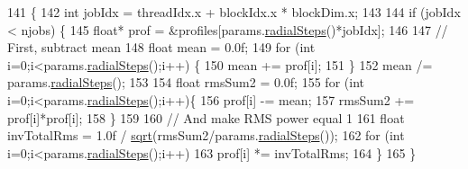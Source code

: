 \begin{DoxyCode}
141 \{
142     \textcolor{keywordtype}{int} jobIdx = threadIdx.x + blockIdx.x * blockDim.x;
143 
144     \textcolor{keywordflow}{if} (jobIdx < njobs) \{
145         \textcolor{keywordtype}{float}* prof = &profiles[params.\hyperlink{struct_z_l_u_t_params_a9579a1f453fa4966bbd7ca5c04a389d9}{radialSteps}()*jobIdx];
146 
147         \textcolor{comment}{// First, subtract mean}
148         \textcolor{keywordtype}{float} mean = 0.0f;
149         \textcolor{keywordflow}{for} (\textcolor{keywordtype}{int} i=0;i<params.\hyperlink{struct_z_l_u_t_params_a9579a1f453fa4966bbd7ca5c04a389d9}{radialSteps}();i++) \{
150             mean += prof[i];
151         \}
152         mean /= params.\hyperlink{struct_z_l_u_t_params_a9579a1f453fa4966bbd7ca5c04a389d9}{radialSteps}();
153 
154         \textcolor{keywordtype}{float} rmsSum2 = 0.0f;
155         \textcolor{keywordflow}{for} (\textcolor{keywordtype}{int} i=0;i<params.\hyperlink{struct_z_l_u_t_params_a9579a1f453fa4966bbd7ca5c04a389d9}{radialSteps}();i++)\{
156             prof[i] -= mean;
157             rmsSum2 += prof[i]*prof[i];
158         \}
159 
160         \textcolor{comment}{// And make RMS power equal 1}
161         \textcolor{keywordtype}{float} invTotalRms = 1.0f / \hyperlink{std__incl_8h_a8a38721046513951c4bfc32bf101e180}{sqrt}(rmsSum2/params.\hyperlink{struct_z_l_u_t_params_a9579a1f453fa4966bbd7ca5c04a389d9}{radialSteps}());
162         \textcolor{keywordflow}{for} (\textcolor{keywordtype}{int} i=0;i<params.\hyperlink{struct_z_l_u_t_params_a9579a1f453fa4966bbd7ca5c04a389d9}{radialSteps}();i++)
163             prof[i] *= invTotalRms;
164     \}
165 \}
\end{DoxyCode}

